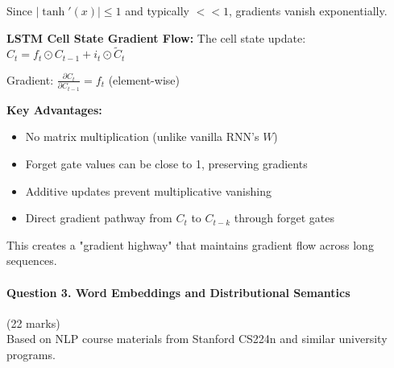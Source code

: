 \documentclass[12pt]{article}
\begin{document}
\begin{enumerate}[(a)]
{    Since $|\tanh'(x)| \leq 1$ and typically $<< 1$, gradients vanish exponentially.
    
    \textbf{LSTM Cell State Gradient Flow:}
    The cell state update: $C_t = f_t \odot C_{t-1} + i_t \odot \tilde{C}_t$
    
    Gradient: $\frac{\partial C_t}{\partial C_{t-1}} = f_t$ (element-wise)
    
    \textbf{Key Advantages:}
    \begin{itemize}
        \item No matrix multiplication (unlike vanilla RNN's $W$)
        \item Forget gate values can be close to 1, preserving gradients
        \item Additive updates prevent multiplicative vanishing
        \item Direct gradient pathway from $C_t$ to $C_{t-k}$ through forget gates
    \end{itemize}
    
    This creates a "gradient highway" that maintains gradient flow across long sequences.
    }
\end{enumerate}

\newpage
\paragraph{Question 3. Word Embeddings and Distributional Semantics}\hfill (22 marks)\\
Based on NLP course materials from Stanford CS224n and similar university programs.
\end{document}
